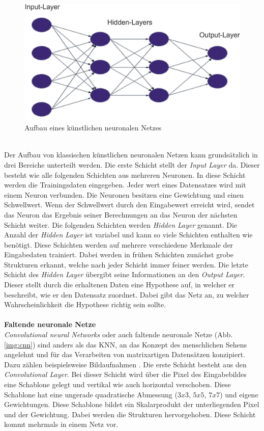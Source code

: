 \begin{figure}
	[h]
	\centering
	\includegraphics[scale=0.5]{Sources/nnet.png}
	\caption{Aufbau eines künstlichen neuronalen Netzes \cite{bistra2018pic}}
	\label{img:neuronales_netz}
\end{figure}\\
Der Aufbau von klassischen künstlichen neuronalen Netzen kann grundsätzlich in drei Bereiche unterteilt werden. Die erste Schicht stellt der \textit{Input Layer} da. Dieser besteht wie alle folgenden Schichten aus mehreren Neuronen. In diese Schicht werden die Trainingsdaten eingegeben. Jeder wert eines Datensatzes wird mit einem Neuron verbunden. Die Neuronen besitzen eine Gewichtung und einen Schwellwert. Wenn der Schwellwert durch den Eingabewert erreicht wird, sendet das Neuron das Ergebnis seiner Berechnungen an das Neuron der nächsten Schicht weiter. Die folgenden Schichten werden \textit{Hidden Layer} genannt. Die Anzahl der \textit{Hidden Layer} ist variabel und kann so viele Schichten enthalten wie benötigt. Diese Schichten werden auf mehrere verschiedene Merkmale der Eingabedaten trainiert. Dabei werden in frühen Schichten zunächst grobe Strukturen erkannt, welche nach jeder Schicht immer feiner werden. Die letzte Schicht des \textit{Hidden Layer} übergibt seine Informationen an den \textit{Output Layer}. Dieser stellt durch die erhaltenen Daten eine Hypothese auf, in welcher er beschreibt, wie er den Datensatz zuordnet. Dabei gibt das Netz an, zu welcher Wahrscheinlichkeit die Hypothese richtig sein sollte.\\\\
\textbf{Faltende neuronale Netze}\label{s.cnn}\\
\textit{Convolutional neural Networks} oder auch faltende neuronale Netze (Abb. \ref{img:cnn}) sind anders als das KNN, an das Konzept des menschlichen Sehens angelehnt \cite{sermanet2012convolutional} und für das Verarbeiten von matrixartigen Datensätzen konzipiert. Dazu zählen beispielsweise Bildaufnahmen \cite{goodfellow2016deep}. Die erste Schicht besteht aus den \textit{Convolutional Layer}. Bei dieser Schicht wird über die Pixel des Eingabebildes eine Schablone gelegt und vertikal wie auch horizontal verschoben. Diese Schablone hat eine ungerade quadratische Abmessung ($3x3$, $5x5$, $7x7$) und eigene Gewichtungen. Diese Schablone bildet ein Skalarprodukt der unterliegenden Pixel und der Gewichtung. Dabei werden die Strukturen hervorgehoben. Diese Schicht kommt mehrmals in einem Netz vor.\\  
